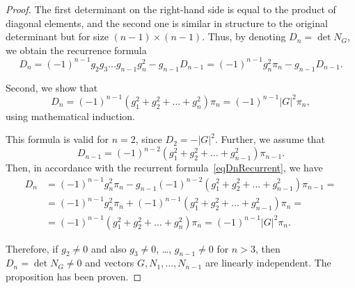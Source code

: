 \documentclass[10pt,a4paper]{amsart}
\begin{document}
\begin{proof}
The first determinant on the right-hand side is equal to the product of diagonal elements, and the second one is similar in structure to the original determinant but for size $(n-1) \times (n-1)$. Thus, by denoting $D_n = \det N_G$, we obtain the recurrence formula
\begin{equation}\label{eqDnRecurrent}
  D_n = (-1)^{n-1} g_2 g_3 \dots g_{n-1} g_n^2 - g_{n-1} D_{n-1} = (-1)^{n-1} g_n^2 \pi_n - g_{n-1} D_{n-1}.
\end{equation}

Second, we show that
\[
  D_n = (-1)^{n-1} (g_1^2 + g_2^2 + \ldots + g_n^2) \pi_n = (-1)^{n-1} |G|^2 \pi_n,
\]
using mathematical induction.

This formula is valid for $n = 2$, since $D_2 = -|G|^2$. Further, we assume that
\[
  D_{n-1} = (-1)^{n-2} (g_1^2 + g_2^2 + \ldots + g_{n-1}^2) \pi_{n-1}.
\]
Then, in accordance with the recurrent formula~\eqref{eqDnRecurrent}, we have
\begin{align*}
  D_n & = (-1)^{n-1} g_n^2 \pi_n - g_{n-1} (-1)^{n-2} (g_1^2 + g_2^2 + \ldots + g_{n-1}^2) \pi_{n-1} = \\
  & = (-1)^{n-1} g_n^2 \pi_n + (-1)^{n-1} (g_1^2 + g_2^2 + \ldots + g_{n-1}^2) \pi_n = \\
  & = (-1)^{n-1} (g_1^2 + g_2^2 + \ldots + g_n^2) \pi_n = (-1)^{n-1} |G|^2 \pi_n.
\end{align*}

Therefore, if $g_2 \neq 0$ and also $g_3 \neq 0$, \dots, $g_{n-1} \neq 0$ for $n > 3$, then $D_n = \det N_G \neq 0$ and vectors $G,N_1,\dots,N_{n-1}$ are linearly independent. The proposition has been proven.
\end{proof}
\end{document}
